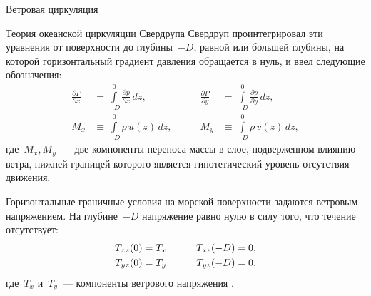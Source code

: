 \begin{chapter}{Ветровая циркуляция}
\begin{section}{Теория океанской циркуляции Свердрупа}
Свердруп проинтегрировал эти уравнения от поверхности до глубины~$-D$, равной
или большей глубины, на которой горизонтальный градиент давления обращается
в нуль, и ввел следующие обозначения:
\begin{subequations}\label{eq:11.2}
\begin{alignat}{2}
\frac{\partial{P}}{\partial{x}} 
   &= \int\limits_{-D}^{0} \frac{\partial{p}}{\partial{x}}\,dz,  
&\qquad \frac{\partial{P}}{\partial{y}} 
   &= \int\limits_{-D}^{0} \frac{\partial{p}}{\partial{y}}\,dz,  \\
M_x 
   &\equiv \int\limits_{-D}^{0} \rho\,u(z)\,dz,          
&\qquad M_y 
   &\equiv \int\limits_{-D}^{0} \rho\,v(z)\,dz,
\end{alignat}
\end{subequations}
где~$M_x, M_y$~--- две компоненты переноса массы
в слое, подверженном влиянию ветра, нижней границей которого является
гипотетический уровень отсутствия движения.
%

Горизонтальные граничные условия на морской поверхности задаются ветровым
напряжением. На глубине~$-D$ напряжение равно нулю
в силу того, что течение отсутствует:
\begin{alignat}{2}\label{eq:11.3}
 T_{xz}(0) &= T_x & \qquad T_{xz}(-D) &= 0, \notag \\
 T_{yz}(0) &= T_y & \qquad T_{yz}(-D) &= 0,
\end{alignat}
где~$T_x$ и~$T_y$~--- компоненты ветрового напряжения%
.
%


\end{section}
\end{chapter}
